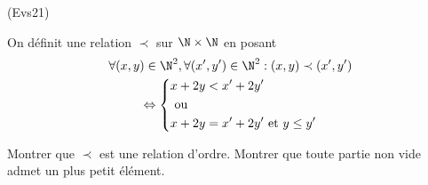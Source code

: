 \begin{tiny}(Evs21)\end{tiny} On définit une relation $\prec$ sur $\N\times \N$ en posant
\begin{multline*}
 \forall (x,y)\in \N^2, \forall (x',y')\in \N^2:
(x,y)\prec (x',y')\\
\Leftrightarrow
\left\lbrace 
\begin{aligned}
& x+2y < x'+2y'\\
&\text{ ou }\\
&x+2y = x'+2y' \text{ et } y\leq y'
\end{aligned}
\right. 
\end{multline*}

Montrer que $\prec$ est une relation d'ordre. Montrer que toute partie non vide admet un plus petit élément.
